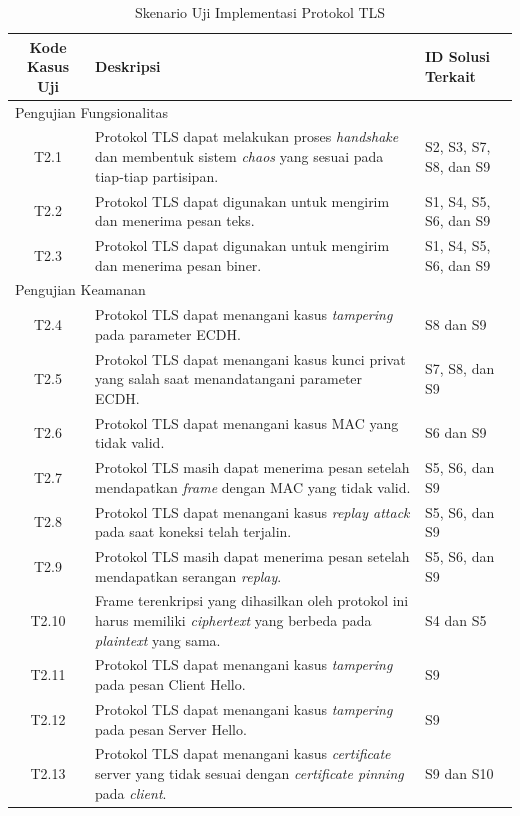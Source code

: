 \begin{table}[!h]
  \centering
  \caption{Skenario Uji Implementasi Protokol TLS} \label{tab:test.case.tls}
  \begin{tabular}{|c|p{7cm}|p{3cm}|}
    \hline
    \textbf{Kode Kasus Uji} & \textbf{Deskripsi} & \textbf{ID Solusi Terkait} \\ \hline
    \multicolumn{3}{|l|}{Pengujian Fungsionalitas} \\ \hline
    T2.1 & Protokol TLS dapat melakukan proses \emph{handshake} dan membentuk sistem \emph{chaos} yang sesuai pada tiap-tiap partisipan. & S2, S3, S7, S8, dan S9\\ \hline
    T2.2 & Protokol TLS dapat digunakan untuk mengirim dan menerima pesan teks. & S1, S4, S5, S6, dan S9 \\ \hline
    T2.3 & Protokol TLS dapat digunakan untuk mengirim dan menerima pesan biner. & S1, S4, S5, S6, dan S9 \\ \hline
    \multicolumn{3}{|l|}{Pengujian Keamanan} \\ \hline
    T2.4 & Protokol TLS dapat menangani kasus \emph{tampering} pada parameter ECDH. & S8 dan S9 \\ \hline
    T2.5 & Protokol TLS dapat menangani kasus kunci privat yang salah saat menandatangani parameter ECDH.  & S7, S8, dan S9 \\ \hline
    T2.6 & Protokol TLS dapat menangani kasus MAC yang tidak valid. & S6 dan S9 \\ \hline
    T2.7 & Protokol TLS masih dapat menerima pesan setelah mendapatkan \emph{frame} dengan MAC yang tidak valid.  & S5, S6, dan S9 \\ \hline
    T2.8 & Protokol TLS dapat menangani kasus \emph{replay attack} pada saat koneksi telah terjalin. & S5, S6, dan S9 \\ \hline
    T2.9 & Protokol TLS masih dapat menerima pesan setelah mendapatkan serangan \emph{replay}. & S5, S6, dan S9 \\ \hline
    T2.10 & Frame terenkripsi yang dihasilkan oleh protokol ini harus memiliki \emph{ciphertext} yang berbeda pada \emph{plaintext} yang sama. & S4 dan S5 \\ \hline
    T2.11 & Protokol TLS dapat menangani kasus \emph{tampering} pada pesan Client Hello. & S9 \\ \hline
    T2.12 & Protokol TLS dapat menangani kasus \emph{tampering} pada pesan Server Hello. & S9 \\ \hline
    T2.13 & Protokol TLS dapat menangani kasus \emph{certificate} server yang tidak sesuai dengan \emph{certificate pinning} pada \emph{client}.  & S9 dan S10 \\ \hline
  \end{tabular}
\end{table}


